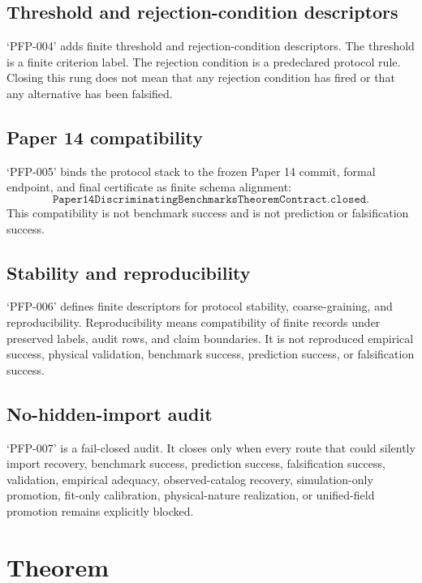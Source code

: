 \documentclass{article}
\begin{document}
\subsection{Threshold and rejection-condition descriptors}

`PFP-004' adds finite threshold and rejection-condition descriptors. The
threshold is a finite criterion label. The rejection condition is a
predeclared protocol rule. Closing this rung does not mean that any rejection
condition has fired or that any alternative has been falsified.

\subsection{Paper 14 compatibility}

`PFP-005' binds the protocol stack to the frozen Paper 14 commit, formal
endpoint, and final certificate as finite schema alignment:
\[
\texttt{Paper14DiscriminatingBenchmarksTheoremContract.closed}.
\]
This compatibility is not benchmark success and is not prediction or
falsification success.

\subsection{Stability and reproducibility}

`PFP-006' defines finite descriptors for protocol stability, coarse-graining,
and reproducibility. Reproducibility means compatibility of finite records
under preserved labels, audit rows, and claim boundaries. It is not reproduced
empirical success, physical validation, benchmark success, prediction success,
or falsification success.

\subsection{No-hidden-import audit}

`PFP-007' is a fail-closed audit. It closes only when every route that could
silently import recovery, benchmark success, prediction success,
falsification success, validation, empirical adequacy, observed-catalog
recovery, simulation-only promotion, fit-only calibration, physical-nature
realization, or unified-field promotion remains explicitly blocked.

\section{Theorem}
\end{document}

